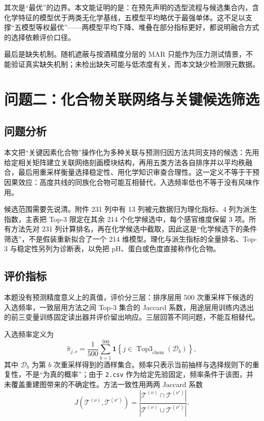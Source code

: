 \documentclass[UTF8,a4paper,zihao=-4]{ctexart}
\numberwithin{figure}{section}
\numberwithin{table}{section}
\numberwithin{equation}{section}
\newcommand{\file}[1]{\texttt{#1}}
\begin{document}
其次是“最优”的边界。本文能证明的是：在预先声明的选型流程与候选集合内，含化学特征的模型优于两类无化学基线，五模型平均略优于最强单体。这不足以支撑“五模型等权最优”——两模型平均下降、堆叠在部分指标更好，都说明融合方式的选择依赖评价口径。

最后是缺失机制。随机遮蔽与按酒精度分层的 MAR 只能作为压力测试情景，不能验证真实缺失机制；未检出缺失可能与低浓度有关，而本文缺少检测限元数据。%

\section{问题二：化合物关联网络与关键候选筛选}
\label{sec:q2}

\subsection{问题分析}

本文把“关键因素化合物”操作化为多种关联与预测归因方法共同支持的候选：先用给定相关矩阵建立关联网络刻画模块结构\cite{wangxiaofan}，再用五类方法各自排序并以平均秩融合，最后用重采样\cite{maosongsong}衡量选择稳定性、用化学知识审查合理性。这一定义不等于干预因果效应：高度共线的同族化合物可能互相替代，入选频率低也不等于没有风味作用。

候选范围需要先说清。附件 231 列中有 13 列被元数据归为理化指标、4 列为派生指数，主表把 Top-3 限定在其余 214 个化学候选中，每个感官维度保留 3 项。所有方法先对 231 列计算排名，再在化学候选中截取，因此这是“化学候选下的条件筛选”，不是假装重新拟合了一个 214 维模型。理化与派生指标的全量排名、Top-3 与稳定性另列为诊断表，以免把 pH、蛋白或色度直接称作化合物。

\subsection{评价指标}

本题没有预测精度意义上的真值，评价分三层：排序层用 500 次重采样下候选的入选频率，一致层用方法之间 Top-3 集合的 Jaccard 系数，用途层用训练内选出的前三变量训练固定读出器并评价留出响应。三层回答不同问题，不能互相替代。

入选频率定义为
\begin{equation}
\hat\pi_{j,s}=\frac{1}{500}\sum_{b=1}^{500}\mathbf{1}\left\{j\in\operatorname{Top3}_{\mathrm{chem}}(\mathcal{D}_b)\right\},
\label{eq:freq}
\end{equation}
其中 $\mathcal{D}_b$ 为第 $b$ 次重采样得到的酒样集合。频率只表示当前抽样与选择规则下的重复性，不是“为真的概率”；由于 \file{2.csv} 作为给定先验固定，频率条件于该图，并未覆盖重建图带来的不确定性。方法一致性用两两 Jaccard 系数
\begin{equation}
J\left(\mathcal{T}^{(\nu)},\mathcal{T}^{(\nu')}\right)=\frac{\left|\mathcal{T}^{(\nu)}\cap\mathcal{T}^{(\nu')}\right|}{\left|\mathcal{T}^{(\nu)}\cup\mathcal{T}^{(\nu')}\right|}.
\label{eq:jaccard}
\end{equation}
\end{document}
